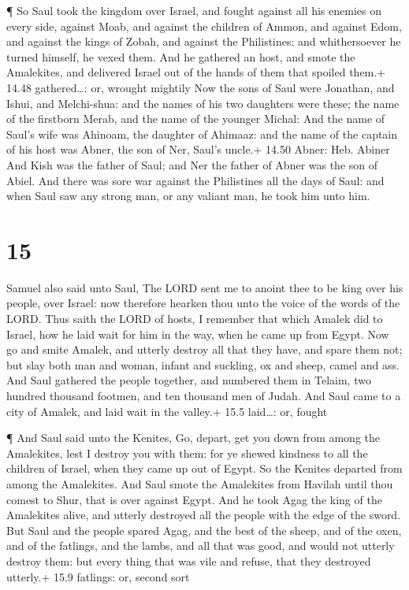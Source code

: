  ¶ So Saul took the kingdom over Israel, and fought against
all his enemies on every side, against Moab, and against the children of
Ammon, and against Edom, and against the kings of Zobah, and against the
Philistines: and whithersoever he turned himself, he vexed them.
 And he gathered an host, and smote the Amalekites, and
delivered Israel out of the hands of them that spoiled them.+ 14.48
gathered\ldots: or, wrought mightily  Now the sons of Saul
were Jonathan, and Ishui, and Melchi-shua: and the names of his two
daughters were these; the name of the firstborn Merab, and the name of
the younger Michal:  And the name of Saul's wife was
Ahinoam, the daughter of Ahimaaz: and the name of the captain of his
host was Abner, the son of Ner, Saul's uncle.+ 14.50 Abner: Heb. Abiner
 And Kish was the father of Saul; and Ner the father of
Abner was the son of Abiel.  And there was sore war against
the Philistines all the days of Saul: and when Saul saw any strong man,
or any valiant man, he took him unto him.

\hypertarget{section-14}{%
\section{15}\label{section-14}}

 Samuel also said unto Saul, The LORD sent me to anoint thee
to be king over his people, over Israel: now therefore hearken thou unto
the voice of the words of the LORD.  Thus saith the LORD of
hosts, I remember that which Amalek did to Israel, how he laid wait for
him in the way, when he came up from Egypt.  Now go and
smite Amalek, and utterly destroy all that they have, and spare them
not; but slay both man and woman, infant and suckling, ox and sheep,
camel and ass.  And Saul gathered the people together, and
numbered them in Telaim, two hundred thousand footmen, and ten thousand
men of Judah.  And Saul came to a city of Amalek, and laid
wait in the valley.+ 15.5 laid\ldots: or, fought

 ¶ And Saul said unto the Kenites, Go, depart, get you down
from among the Amalekites, lest I destroy you with them: for ye shewed
kindness to all the children of Israel, when they came up out of Egypt.
So the Kenites departed from among the Amalekites.  And Saul
smote the Amalekites from Havilah until thou comest to Shur, that is
over against Egypt.  And he took Agag the king of the
Amalekites alive, and utterly destroyed all the people with the edge of
the sword.  But Saul and the people spared Agag, and the
best of the sheep, and of the oxen, and of the fatlings, and the lambs,
and all that was good, and would not utterly destroy them: but every
thing that was vile and refuse, that they destroyed utterly.+ 15.9
fatlings: or, second sort

